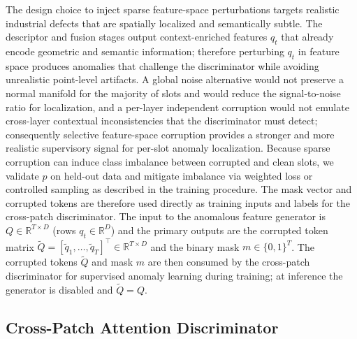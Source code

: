 The design choice to inject sparse feature-space perturbations targets realistic industrial defects that are spatially localized and semantically subtle. The descriptor and fusion stages output context-enriched features \(q_t\) that already encode geometric and semantic information; therefore perturbing \(q_t\) in feature space produces anomalies that challenge the discriminator while avoiding unrealistic point-level artifacts. A global noise alternative would not preserve a normal manifold for the majority of slots and would reduce the signal-to-noise ratio for localization, and a per-layer independent corruption would not emulate cross-layer contextual inconsistencies that the discriminator must detect; consequently selective feature-space corruption provides a stronger and more realistic supervisory signal for per-slot anomaly localization. Because sparse corruption can induce class imbalance between corrupted and clean slots, we validate \(p\) on held-out data and mitigate imbalance via weighted loss or controlled sampling as described in the training procedure. The mask vector and corrupted tokens are therefore used directly as training inputs and labels for the cross-patch discriminator. The input to the anomalous feature generator is \(Q\in\mathbb{R}^{T\times D}\) (rows \(q_t\in\mathbb{R}^D\)) and the primary outputs are the corrupted token matrix \(\tilde{Q}=[\tilde{q}_1,\dots,\tilde{q}_T]^\top\in\mathbb{R}^{T\times D}\) and the binary mask \(m\in\{0,1\}^T\). The corrupted tokens \(\tilde{Q}\) and mask \(m\) are then consumed by the cross-patch discriminator for supervised anomaly learning during training; at inference the generator is disabled and \(\tilde{Q}=Q\).

\subsection{Cross-Patch Attention Discriminator}

